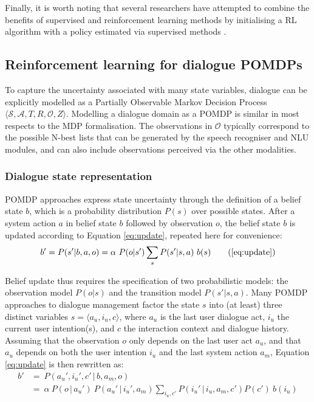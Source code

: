 Finally, it is worth noting that several researchers have attempted to combine the benefits of supervised and reinforcement learning methods by initialising a RL algorithm with a policy estimated via supervised methods \citep{williams2003, rieser2006}.

\subsection{Reinforcement learning for dialogue POMDPs}

To capture the uncertainty associated with many state variables, dialogue can be explicitly modelled as a Partially Observable Markov Decision Process $\langle \mathcal{S}, \mathcal{A}, T, R, \mathcal{O}, Z \rangle$.  Modelling a dialogue domain as a POMDP is similar in most respects to the MDP formalisation.  The observations in $\mathcal{O}$ typically correspond to the possible N-best lists that can be generated by the speech recogniser and NLU modules, and can also include observations perceived via the other modalities.  

\subsubsection*{Dialogue state representation}

POMDP approaches express state uncertainty through the definition of a belief state $b$, which is a probability distribution $P(s)$ over possible states.  After a system action $a$ in belief state $b$ followed by observation $o$, the belief state $b$ is updated according to Equation \eqref{eq:update}, repeated here for convenience:
\begin{align}
b' = P(s'|b, a,o) = \alpha \ P(o|s') \sum_{s} P(s'|s,a) \ b(s)   \tag{\ref{eq:update}}
\end{align}

Belief update thus requires the specification of two probabilistic models: the observation model $P(o|s)$ and the transition model $P(s'|s,a)$. Many POMDP approaches to dialogue management factor the state $s$ into (at least) three distinct variables $s = \langle a_u, i_u, c \rangle$, where $a_u$ is the last user dialogue act, $i_u$ the current user intention(s), and $c$ the interaction context and dialogue history.   Assuming that the observation $o$ only depends on the last user act $a_u$, and that $a_u$ depends on both the user intention $i_u$ and the last system action $a_m$, Equation \eqref{eq:update} is then rewritten as:
\begin{align}
b' & = \ P(a_u', i_u', c' \, | \, b, a_m,o)\\
& = \ \alpha \ P(o \, | \, a_u') \ P(a_u' \, | \, i_u', a_m) \sum_{i_u, c'} P(i_u' \, | \, i_u,a_m, c') P(c') \ b(i_u)
\end{align}

